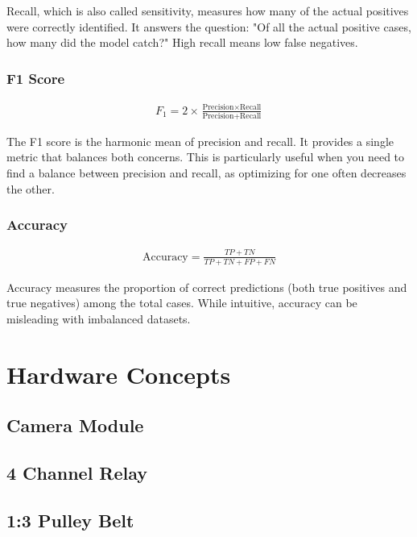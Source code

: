 Recall, which is also called sensitivity, measures how many of the actual positives were correctly identified. 
It answers the question: 
"Of all the actual positive cases, how many did the model catch?" High recall means low false negatives.

\subsubsection{F1 Score}
\begin{eqnarray}
	F_1 = 2\times \frac{\text{Precision} \times \text{Recall}}{\text{Precision} + \text{Recall}}
	\label{eq:f1_score}
\end{eqnarray}

The F1 score is the harmonic mean of precision and recall. It provides a single metric that balances 
both concerns. This is particularly useful when you need to 
find a balance between precision and recall, as optimizing for one often decreases the other.

\subsubsection{Accuracy}
\begin{eqnarray}
	\text{Accuracy} = \frac{TP + TN}{TP + TN + FP + FN}
	\label{eq:accuracy}
\end{eqnarray}

Accuracy measures the proportion of correct predictions (both true positives and true negatives)
 among the total cases. While intuitive, accuracy can be misleading with imbalanced datasets.

\section{Hardware Concepts}

\subsection{Camera Module} 

\subsection{4 Channel Relay}

\subsection{1:3 Pulley Belt}


